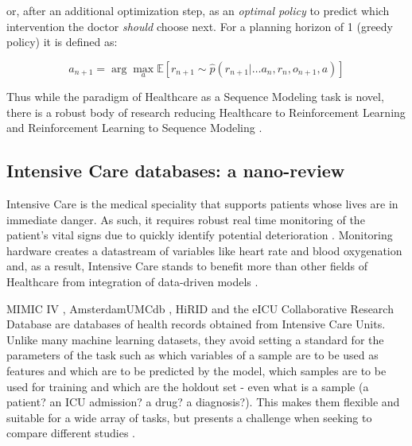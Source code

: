or, after an additional optimization step, as an \emph{optimal policy} to predict which intervention the doctor \emph{should} choose next.
For a planning horizon of 1 (greedy policy) it is defined as:

\begin{equation}
    a_{n+1} = \arg \max_a \mathbb{E} [r_{n+1} \sim \hat{p}(r_{n+1} | \dots a_n, r_n, o_{n+1}, a)]
\end{equation}

Thus while the paradigm of Healthcare as a Sequence Modeling task is novel, there is a robust body of research reducing Healthcare to Reinforcement Learning \cite{yuReinforcementLearningHealthcare2021} and Reinforcement Learning to Sequence Modeling \cite{chenDecisionTransformerReinforcement2021,jannerOfflineReinforcementLearning2021,schmidhuberReinforcementLearningUpside2020}. 

\subsection{Intensive Care databases: a nano-review}

Intensive Care is the medical speciality that supports patients whose lives are in immediate danger.
As such, it requires robust real time monitoring of the patient's vital signs due to quickly identify potential deterioration \cite{baileyTrialRealtimeAlert2013,blountRealTimeAnalysisIntensive2010,bockholtRealTimeMonitoringBlood2022,dimitriosg.katehakisDistributedAgentBasedArchitecture1999,friedStatisticalMethodsIntensive2000,maoIntegratedDataMining2012,prgometVitalSignsMonitoring2016,vincentImprovingDetectionPatient2018}.
Monitoring hardware creates a datastream of variables like heart rate and blood oxygenation and, as a result, Intensive Care stands to benefit more than other fields of Healthcare from integration of data-driven models \cite{nunezreizBigDataAnalysis2019}.

MIMIC IV \cite{johnsonMIMICIVFreelyAccessible2023}, AmsterdamUMCdb \cite{amsterdamumcdb}, HiRID \cite{yecheHiRIDICUBenchmarkComprehensiveMachine} and the eICU Collaborative Research Database \cite{pollardEICUCollaborativeResearch2018} are databases of health records obtained from Intensive Care Units.
Unlike many machine learning datasets, they avoid setting a standard for the parameters of the task such as which variables of a sample are to be used as features and which are to be predicted by the model, which samples are to be used for training and which are the holdout set - even what is a sample (a patient? an ICU admission? a drug? a diagnosis?). This makes them flexible and suitable for a wide array of tasks, but presents a challenge when seeking to compare different studies \cite{mcdermottReproducibilityMachineLearning2021}.

